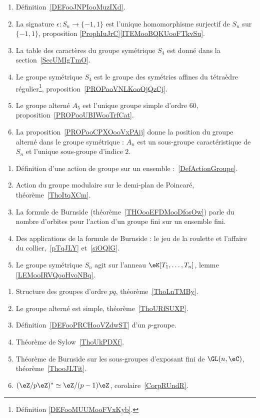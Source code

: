 \begin{enumerate}
    \item
        Définition~\ref{DEFooJNPIooMuzIXd}.
    \item
        La signature \( \epsilon\colon S_n\to \{ -1,1 \}\) est l'unique homomorphisme surjectif de \( S_n\) sur \( \{ -1,1 \}\), proposition \ref{ProphIuJrC}\ref{ITEMooBQKUooFTkvSu}.
    \item
        La table des caractères du groupe symétrique \( S_4\) est donné dans la section~\ref{SecUMIgTmO}.
    \item
        Le groupe symétrique \( S_4\) est le groupe des symétries affines du tétraèdre régulier\footnote{Définition \ref{DEFooMUUMooFVxKyb}.}, proposition~\ref{PROPooVNLKooOjQzCj}.
    \item
        Le groupe alterné \( A_5\) est l'unique groupe simple d'ordre \( 60\), proposition~\ref{PROPooUBIWooTrfCat}.
    \item
        La proposition~\ref{PROPooCPXOooVxPAij} donne la position du groupe alterné dans le groupe symétrique : \( A_n\) est un sous-groupe caractéristique de \( S_n\) et l'unique sous-groupe d'indice \( 2\).
\end{enumerate}

    \label{THEMEooKZHBooRCULcr}
    \begin{enumerate}
        \item Définition d'une action de groupe sur un ensemble :~\ref{DefActionGroupe}.
    \item Action du groupe modulaire sur le demi-plan de Poincaré, théorème~\ref{ThoItqXCm}.
    \item
        La formule de Burnside (théorème~\ref{THOooEFDMooDfosOw}) parle du nombre d'orbites pour l'action d'un groupe fini sur un ensemble fini.
    \item Des applications de la formule de Burnside : le jeu de la roulette et l'affaire du collier,~\ref{pTqJLY} et~\ref{siOQlG}.
    \item
        
        Le groupe symétrique  \( S_n\) agit sur l'anneau  \( \eK[T_1,\ldots, T_n]\), lemme \ref{LEMooIRVQooHvoNBq}.

    \end{enumerate}


\begin{enumerate}
    \item Structure des groupes d'ordre \( pq\), théorème~\ref{ThoLnTMBy}.
    \item Le groupe alterné est simple, théorème~\ref{ThoURfSUXP}.
    \item Définition~\ref{DEFooPRCHooVZdwST} d'un \( p\)-groupe.
    \item Théorème de Sylow~\ref{ThoUkPDXf}.
    \item Théorème de Burnside sur les sous-groupes d'exposant fini de \( \GL(n,\eC)\), théorème~\ref{ThooJLTit}.
    \item \( (\eZ/p\eZ)^*\simeq \eZ/(p-1)\eZ\), corolaire~\ref{CorpRUndR}.
\end{enumerate}



